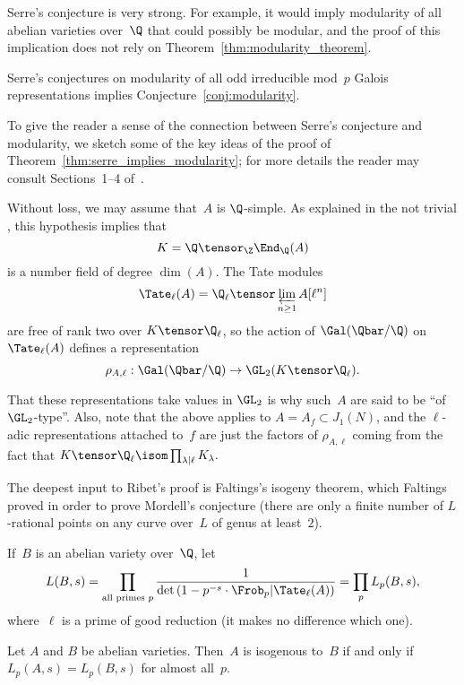 \documentclass{report}
\begin{document}
Serre's conjecture is very strong.  For example, it would imply
modularity of all abelian varieties over~$\Q$ that could possibly be
modular, and the proof of this implication does not rely on
Theorem~\ref{thm:modularity_theorem}.

\begin{theorem}[Ribet]\label{thm:serre_implies_modularity}
  Serre's conjectures on modularity of all odd irreducible mod~$p$
  Galois representations implies Conjecture~\ref{conj:modularity}.
\end{theorem}

To give the reader a sense of the connection between Serre's
conjecture and modularity, we sketch some of the key ideas of the
proof of Theorem~\ref{thm:serre_implies_modularity}; for more details
the reader may consult Sections~1--4 of~\cite{ribet:abvars}.

Without loss, we may assume that~$A$ is $\Q$-simple.  As explained in
the not trivial \cite[Thm.~2.1]{ribet:abvars}, this hypothesis implies
that
$$
  K = \Q\tensor_\Z \End_{\Q}(A)
  $$
  is a number field of degree $\dim(A)$.  The Tate modules
  $$
  \Tate_\ell(A)= \Q_\ell\tensor\varprojlim_{n\geq 1} A[\ell^n]
  $$
  are free of rank two over $K\tensor\Q_{\ell}$, so the action of
  $\Gal(\Qbar/\Q)$ on $\Tate_\ell(A)$ defines a representation
  $$
  \rho_{A,\ell} : \Gal(\Qbar/\Q) \to \GL_2(K\tensor \Q_{\ell}).
  $$
\begin{remarks}
  That these representations take values in $\GL_2$ is why such~$A$
  are said to be ``of $\GL_2$-type''.  Also, note that the above
  applies to $A=A_f\subset J_1(N)$, and the $\ell$-adic
  representations attached to~$f$ are just the factors of
  $\rho_{A,\ell}$ coming from the fact that $K\tensor\Q_{\ell}\isom
  \prod_{\lambda\mid \ell} K_{\lambda}.$
\end{remarks}

The deepest input to Ribet's proof is Faltings's isogeny theorem,
which Faltings proved in order to prove Mordell's conjecture (there
are only a finite number of $L$-rational points on any curve over~$L$
of genus at least~$2$).

If~$B$ is an abelian variety over~$\Q$, let
$$
   L(B,s) = \prod_{\text{all primes }p}
\frac{1}{\det\left(1-p^{-s}\cdot \Frob_p|\Tate_{\ell}(A)\right)}
 = \prod_p L_p(B,s),
$$
 where~$\ell$ is a prime of good reduction (it makes no difference
 which one).
\begin{theorem}[Faltings]\label{thm:faltings}
  Let $A$ and $B$ be abelian varieties.  Then~$A$ is isogenous to~$B$
  if and only if $L_p(A,s) = L_p(B,s)$ for almost all~$p$.
\end{theorem}
\end{document}
